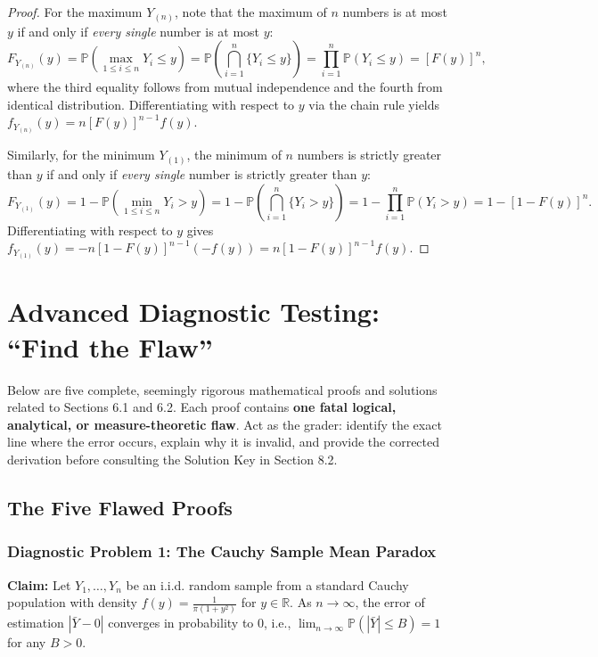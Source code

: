 \documentclass[11pt, letterpaper]{article}
\theoremstyle{definition}
\theoremstyle{remark}
\newcommand{\R}{\mathbb{R}}
\newcommand{\Prob}{\mathbb{P}}
\begin{document}
\begin{proof}
For the maximum $Y_{(n)}$, note that the maximum of $n$ numbers is at most $y$ if and only if \emph{every single} number is at most $y$:
\[
    F_{Y_{(n)}}(y) = \Prob\left(\max_{1 \le i \le n} Y_i \le y\right) = \Prob\left(\bigcap_{i=1}^{n} \{Y_i \le y\}\right) = \prod_{i=1}^{n} \Prob(Y_i \le y) = \left[F(y)\right]^n,
\]
where the third equality follows from mutual independence and the fourth from identical distribution. Differentiating with respect to $y$ via the chain rule yields $f_{Y_{(n)}}(y) = n [F(y)]^{n-1} f(y)$.

Similarly, for the minimum $Y_{(1)}$, the minimum of $n$ numbers is strictly greater than $y$ if and only if \emph{every single} number is strictly greater than $y$:
\[
    F_{Y_{(1)}}(y) = 1 - \Prob\left(\min_{1 \le i \le n} Y_i > y\right) = 1 - \Prob\left(\bigcap_{i=1}^{n} \{Y_i > y\}\right) = 1 - \prod_{i=1}^{n} \Prob(Y_i > y) = 1 - \left[1 - F(y)\right]^n.
\]
Differentiating with respect to $y$ gives $f_{Y_{(1)}}(y) = -n [1 - F(y)]^{n-1} (-f(y)) = n [1 - F(y)]^{n-1} f(y)$.
\end{proof}

\newpage

\section{Advanced Diagnostic Testing: ``Find the Flaw''}

Below are five complete, seemingly rigorous mathematical proofs and solutions related to Sections 6.1 and 6.2. Each proof contains \textbf{one fatal logical, analytical, or measure-theoretic flaw}. Act as the grader: identify the exact line where the error occurs, explain why it is invalid, and provide the corrected derivation before consulting the Solution Key in Section 8.2.

\subsection{The Five Flawed Proofs}

\subsubsection*{Diagnostic Problem 1: The Cauchy Sample Mean Paradox}
\textbf{Claim:} Let $Y_1, \dots, Y_n$ be an i.i.d. random sample from a standard Cauchy population with density $f(y) = \frac{1}{\pi(1 + y^2)}$ for $y \in \R$. As $n \to \infty$, the error of estimation $|\bar{Y} - 0|$ converges in probability to $0$, i.e., $\lim_{n \to \infty} \Prob(|\bar{Y}| \le B) = 1$ for any $B > 0$.
\end{document}
